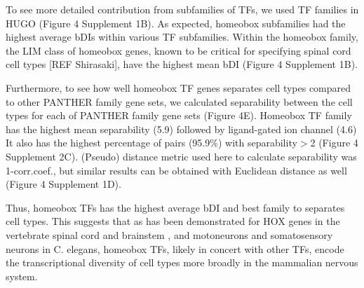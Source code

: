 To see more detailed contribution from subfamilies of TFs, we used TF families in HUGO (Figure 4 Supplement 1B). As expected, homeobox subfamilies had the highest average bDIs within various TF subfamilies. Within the homeobox family, the LIM class of homeobox genes, known to be critical for specifying spinal cord cell types [REF Shirasaki], have the highest mean bDI (Figure 4 Supplement 1B). 

Furthermore, to see how well homeobox TF genes separates cell types compared to other PANTHER family gene sets, 
we calculated separability between the cell types for each of PANTHER family gene sets (Figure 4E). Homeobox TF family has the highest mean separability (5.9) followed by ligand-gated ion channel (4.6) It also has the highest percentage of pairs (95.9\%) with separability$>$2 (Figure 4 Supplement 2C). (Pseudo) distance metric used here to calculate separability was 1-corr.coef., but similar results can be obtained with Euclidean distance as well (Figure 4 Supplement 1D). 

Thus, homeobox TFs has the highest average bDI and best family to separates cell types. This suggests that as has been demonstrated for HOX genes in the vertebrate spinal cord and brainstem \cite{Dasen_2009,Philippidou_2013}, and motoneurons \cite{Kratsios_2017} and somatosensory neurons \cite{Zheng_2015} in C. elegans, homeobox TFs, likely in concert with other TFs, encode the transcriptional diversity of cell types more broadly in the mammalian nervous system.
